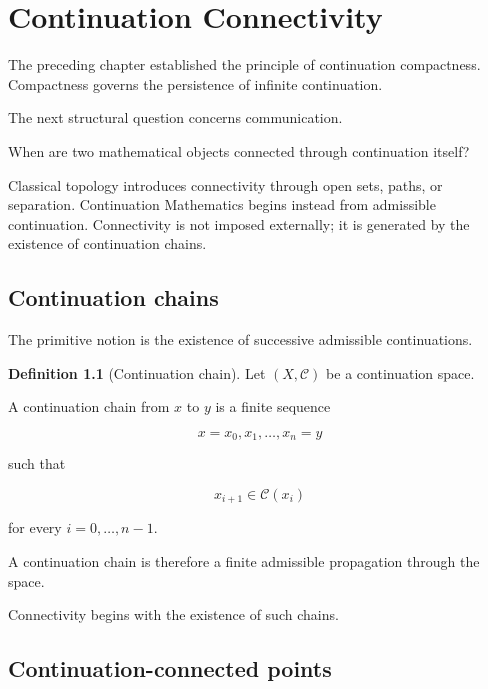 \documentclass[13pt,openany]{book}
\theoremstyle{plain}
\theoremstyle{definition}
\newtheorem{definition}{Definition}[chapter]
\begin{document}
\chapter{Continuation Connectivity}

The preceding chapter established the principle of continuation compactness.
Compactness governs the persistence of infinite continuation.

The next structural question concerns communication.

When are two mathematical objects connected through continuation itself?

Classical topology introduces connectivity through open sets, paths, or
separation. Continuation Mathematics begins instead from admissible
continuation. Connectivity is not imposed externally; it is generated by the
existence of continuation chains.

\section{Continuation chains}

The primitive notion is the existence of successive admissible continuations.

\begin{definition}[Continuation chain]
Let $(X,\mathcal C)$ be a continuation space.

A continuation chain from $x$ to $y$ is a finite sequence

\[
x=x_0,x_1,\ldots,x_n=y
\]

such that

\[
x_{i+1}\in\mathcal C(x_i)
\]

for every $i=0,\ldots,n-1$.
\end{definition}

A continuation chain is therefore a finite admissible propagation through the
space.

Connectivity begins with the existence of such chains.

\section{Continuation-connected points}
\end{document}
